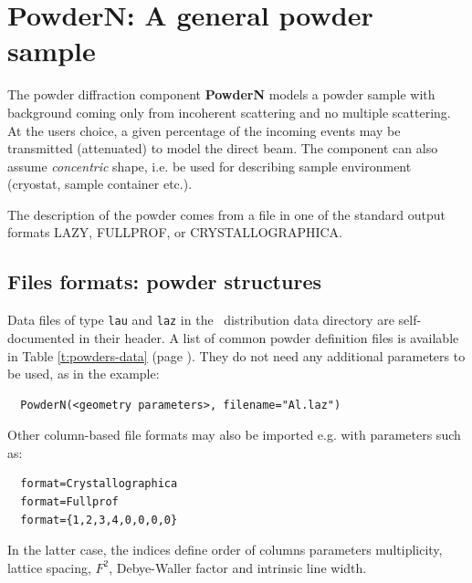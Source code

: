 \section{PowderN: A general powder sample}
\label{powder}


The powder diffraction component {\bf PowderN} models a powder sample
with background coming only from incoherent scattering and no
multiple scattering. At the users choice, a given percentage of the incoming
events may be transmitted (attenuated) to model the direct beam. The component can also
assume \emph{concentric} shape, i.e. be used for describing sample environment (cryostat,
sample container etc.). 

The description of the powder comes from a file in one of the standard output formats LAZY, FULLPROF, or CRYSTALLOGRAPHICA.


\subsection{Files formats: powder structures}

Data files of type \verb'lau' and \verb'laz' in the \MCX\ distribution data directory are self-documented in their header. A list of common powder definition files is available in Table \ref{t:powders-data} (page \pageref{t:powders-data}). They do not need any additional parameters to be used, as in the example:
\begin{verbatim}
  PowderN(<geometry parameters>, filename="Al.laz")
\end{verbatim}
Other column-based file formats may also be imported e.g. with parameters such as:
\begin{verbatim}
  format=Crystallographica
  format=Fullprof
  format={1,2,3,4,0,0,0,0}
\end{verbatim}
In the latter case, the indices define order of columns parameters
multiplicity, lattice spacing, $F^2$, Debye-Waller factor and intrinsic line width.


